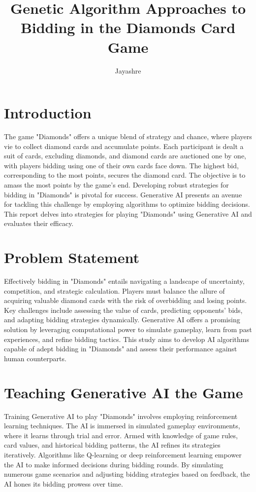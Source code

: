 \documentclass{article}
\title{Genetic Algorithm Approaches to Bidding in the Diamonds Card Game}
\author{Jayashre}
\date{}
\begin{document}
\maketitle

\section{Introduction}
The game "Diamonds" offers a unique blend of strategy and chance, where players vie to collect diamond cards and accumulate points. Each participant is dealt a suit of cards, excluding diamonds, and diamond cards are auctioned one by one, with players bidding using one of their own cards face down. The highest bid, corresponding to the most points, secures the diamond card. The objective is to amass the most points by the game's end. Developing robust strategies for bidding in "Diamonds" is pivotal for success. Generative AI presents an avenue for tackling this challenge by employing algorithms to optimize bidding decisions. This report delves into strategies for playing "Diamonds" using Generative AI and evaluates their efficacy.

\section{Problem Statement}
Effectively bidding in "Diamonds" entails navigating a landscape of uncertainty, competition, and strategic calculation. Players must balance the allure of acquiring valuable diamond cards with the risk of overbidding and losing points. Key challenges include assessing the value of cards, predicting opponents' bids, and adapting bidding strategies dynamically. Generative AI offers a promising solution by leveraging computational power to simulate gameplay, learn from past experiences, and refine bidding tactics. This study aims to develop AI algorithms capable of adept bidding in "Diamonds" and assess their performance against human counterparts.

\section{Teaching Generative AI the Game}
Training Generative AI to play "Diamonds" involves employing reinforcement learning techniques. The AI is immersed in simulated gameplay environments, where it learns through trial and error. Armed with knowledge of game rules, card values, and historical bidding patterns, the AI refines its strategies iteratively. Algorithms like Q-learning or deep reinforcement learning empower the AI to make informed decisions during bidding rounds. By simulating numerous game scenarios and adjusting bidding strategies based on feedback, the AI hones its bidding prowess over time.
\end{document}
